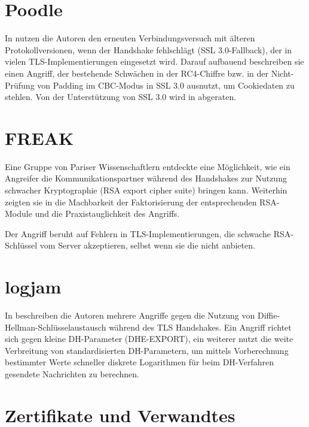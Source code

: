 \section{Poodle}

In \cite{moeller14} nutzen die Autoren den erneuten Verbindungsversuch mit älteren Protokollversionen, wenn der Handshake fehlschlägt (SSL 3.0-Fallback), der in vielen TLS-Implementierungen eingesetzt wird. Darauf aufbauend beschreiben sie einen Angriff, der bestehende Schwächen in der RC4-Chiffre  bzw. in der Nicht-Prüfung von Padding im CBC-Modus in SSL 3.0 ausnutzt, um Cookiedaten zu stehlen.
Von der Unterstützung von SSL 3.0 wird in \cite{deprecate_ssl30} abgeraten.

\section{FREAK}

\label{sec_attack_freak}

Eine Gruppe von Pariser Wissenschaftlern entdeckte eine Möglichkeit, wie ein Angreifer die Kommunikationspartner während des Handshakes zur Nutzung schwacher Kryptographie (RSA export cipher suite) bringen kann. Weiterhin zeigten sie in \cite{freak15} die Machbarkeit der Faktorisierung der entsprechenden RSA-Module und die Praxistauglichkeit des Angriffs.

Der Angriff beruht auf Fehlern in TLS-Implementierungen, die schwache RSA-Schlüssel vom Server akzeptieren, selbst wenn sie die \ciphersuites{} nicht anbieten.

\section{logjam}

In \cite{logjam15} beschreiben die Autoren mehrere Angriffe gegen die Nutzung von Diffie-Hellman-Schlüsselaustausch während des TLS Handshakes. Ein Angriff richtet sich gegen kleine DH-Parameter (DHE-EXPORT), ein weiterer nutzt die weite Verbreitung von standardisierten DH-Parametern, um mittels Vorberechnung bestimmter Werte schneller diskrete Logarithmen für beim DH-Verfahren gesendete Nachrichten zu berechnen.

\section{Zertifikate und Verwandtes}

